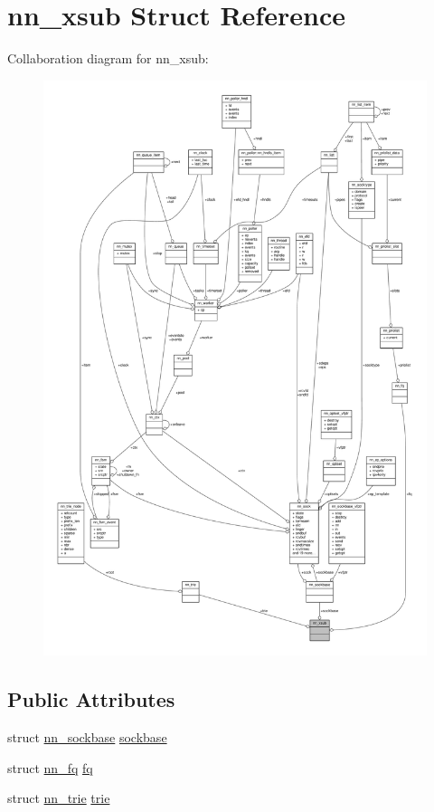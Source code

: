 \hypertarget{structnn__xsub}{}\section{nn\+\_\+xsub Struct Reference}
\label{structnn__xsub}


Collaboration diagram for nn\+\_\+xsub\+:\nopagebreak
\begin{figure}[H]
\begin{center}
\leavevmode
\includegraphics[width=350pt]{structnn__xsub__coll__graph}
\end{center}
\end{figure}
\subsection*{Public Attributes}
\begin{DoxyCompactItemize}
\item 
struct \hyperlink{structnn__sockbase}{nn\+\_\+sockbase} \hyperlink{structnn__xsub_ae8be666a045e96afac3fa0c5479e6562}{sockbase}
\item 
struct \hyperlink{structnn__fq}{nn\+\_\+fq} \hyperlink{structnn__xsub_a53b351025205d5c32035a97e082d5d41}{fq}
\item 
struct \hyperlink{structnn__trie}{nn\+\_\+trie} \hyperlink{structnn__xsub_ad2717708af5bad6da6e686034dc91629}{trie}
\end{DoxyCompactItemize}


